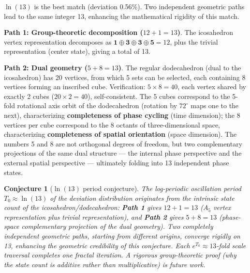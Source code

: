 \documentclass[12pt,a4paper,twocolumn]{article}
\newtheorem{conjecture}[theorem]{Conjecture}
\begin{document}
$\ln(13)$ is the best match (deviation 0.56\%). Two independent geometric paths lead to the same integer 13, enhancing the mathematical rigidity of this match.

\textbf{Path 1: Group-theoretic decomposition ($12 + 1 = 13$)}. The icosahedron vertex representation decomposes as $\mathbf{1}\oplus\mathbf{3}\oplus\mathbf{3}\oplus\mathbf{5} = 12$, plus the trivial representation (center state), giving a total of 13.

\textbf{Path 2: Dual geometry ($5 + 8 = 13$)}. The regular dodecahedron (dual to the icosahedron) has 20 vertices, from which 5 sets can be selected, each containing 8 vertices forming an inscribed cube. Verification: $5 \times 8 = 40$, each vertex shared by exactly 2 cubes ($20 \times 2 = 40$), self-consistent. The 5 cubes correspond to the 5-fold rotational axis orbit of the dodecahedron (rotation by $72^\circ$ maps one to the next), characterizing \textbf{completeness of phase cycling} (time dimension); the 8 vertices per cube correspond to the 8 octants of three-dimensional space, characterizing \textbf{completeness of spatial orientation} (space dimension). The numbers 5 and 8 are not orthogonal degrees of freedom, but two complementary projections of the same dual structure --- the internal phase perspective and the external spatial perspective --- ultimately folding into 13 independent phase states.

\begin{conjecture}[$\ln(13)$ period conjecture]
\label{conj:ln13_en}
The log-periodic oscillation period $T_0 \approx \ln(13)$ of the deviation distribution originates from the intrinsic state count of the icosahedron/dodecahedron: \textbf{Path 1} gives $12+1=13$ ($A_5$ vertex representation plus trivial representation), and \textbf{Path 2} gives $5+8=13$ (phase-space complementary projection of the dual geometry). Two completely independent geometric paths, starting from different origins, converge rigidly on 13, enhancing the geometric credibility of this conjecture. Each $e^{T_0}\approx 13$-fold scale traversal completes one fractal iteration. A rigorous group-theoretic proof (why the state count is additive rather than multiplicative) is future work.
\end{conjecture}
\end{document}
